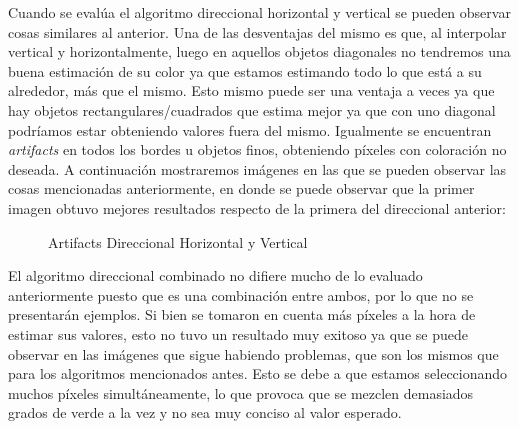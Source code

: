 \documentclass[10pt, a4paper]{article}
\begin{document}
Cuando se eval\'ua el algoritmo direccional horizontal y vertical se pueden observar cosas similares al anterior. Una de las desventajas del mismo es que, al interpolar vertical y horizontalmente, luego en aquellos objetos diagonales no tendremos una buena estimaci\'on de su color ya que estamos estimando todo lo que est\'a a su alrededor, m\'as que el mismo. Esto mismo puede ser una ventaja a veces ya que hay objetos rectangulares/cuadrados que estima mejor ya que con uno diagonal podr\'iamos estar obteniendo valores fuera del mismo. Igualmente se encuentran \textit{artifacts} en todos los bordes u objetos finos, obteniendo p\'ixeles con coloraci\'on no deseada. A continuaci\'on mostraremos im\'agenes en las que se pueden observar las cosas mencionadas anteriormente, en donde se puede observar que la primer imagen obtuvo mejores resultados respecto de la primera del direccional anterior:

\begin{figure}[H]
\centering
	\caption{Artifacts Direccional Horizontal y Vertical} 
\end{figure}

El algoritmo direccional combinado no difiere mucho de lo evaluado anteriormente puesto que es una combinaci\'on entre ambos, por lo que no se presentar\'an ejemplos. Si bien se tomaron en cuenta m\'as p\'ixeles a la hora de estimar sus valores, esto no tuvo un resultado muy exitoso ya que se puede observar en las im\'agenes que sigue habiendo problemas, que son los mismos que para los algoritmos mencionados antes. Esto se debe a que estamos seleccionando muchos p\'ixeles simult\'aneamente, lo que provoca que se mezclen demasiados grados de verde a la vez y no sea muy conciso al valor esperado. 
\end{document}
